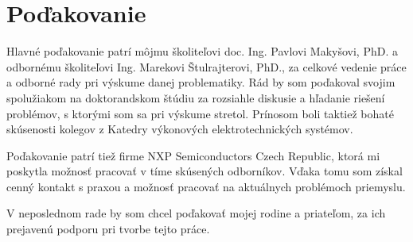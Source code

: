 \chapter*{Poďakovanie}

Hlavné poďakovanie patrí môjmu školiteľovi doc. Ing. Pavlovi Makyšovi, PhD. a odbornému školiteľovi Ing. Marekovi Štulrajterovi, PhD., za celkové vedenie práce a odborné rady pri výskume danej problematiky. Rád by som poďakoval svojim spolužiakom na doktorandskom štúdiu za rozsiahle diskusie a hľadanie riešení problémov, s ktorými som sa pri výskume stretol. Prínosom boli taktiež bohaté skúsenosti kolegov z Katedry výkonových elektrotechnických systémov.

Poďakovanie patrí tiež firme NXP Semiconductors Czech Republic, ktorá mi poskytla možnosť pracovať v tíme skúsených odborníkov. Vďaka tomu som získal cenný kontakt s praxou a možnosť pracovať na aktuálnych problémoch priemyslu.

V neposlednom rade by som chcel poďakovať mojej rodine a priateľom, za ich prejavenú podporu pri tvorbe tejto práce.

%
%
